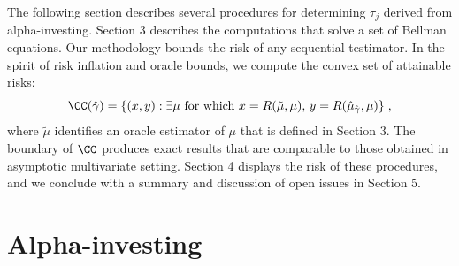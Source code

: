 \documentclass[12pt]{article}
\begin{document}
 The following section describes several procedures for determining $\tau_j$
 derived from alpha-investing.  Section 3 describes the computations that
 solve a set of Bellman equations.  Our methodology bounds the risk of any
 sequential testimator.  In the spirit of risk inflation and oracle bounds, we
 compute the convex set of attainable risks:
 \begin{equation}
   \CC(\hat\gamma) 
      = \{(x,y): \exists \mu \mbox{ for which }
                 x=R(\tilde\mu,\mu), \, y = R(\hat\mu_{\hat\gamma},\mu)\} \;,
 \label{eq:C}
 \end{equation}
 where $\tilde\mu$ identifies an oracle estimator of $\mu$ that is defined in
 Section 3.  The boundary of $\CC$ produces exact results that are comparable to
 those obtained in asymptotic multivariate setting.  Section 4 displays the risk
 of these procedures, and we conclude with a summary and discussion of open
 issues in Section 5.


\section{ Alpha-investing }
\end{document}
